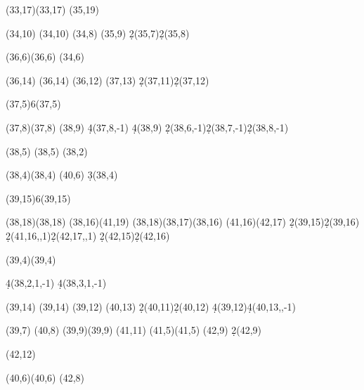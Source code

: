 \documentclass{article}
\begin{document}
\begin{sseqdata}
\class["P^4h_1"](33,17)\etasqclass(33,17)
\divfourclass["P^4h_2" right](35,19)

\class(34,10)
\divfourclass["d_0g" left](34,10)
\etaclass(34,8)
\divfourclass["m" right](35,9)
\d2(35,7)\d2(35,8) %


\class["t"](36,6)\etaclass(36,6)
\nustruct(34,6)

\class(36,14)
\divfourclass["P^2g" left](36,14)
\etaclass(36,12)
\divfourclass["Pk" {right=0em}](37,13)
\d2(37,11)\d2(37,12) %


\tower(37,5){6}\classoptions["x"](37,5)

\class["e_0g"](37,8)\etaclass(37,8)
\diveightclass["y" right](38,9)
\d4(37,8,-1) \d4(38,9)%
\d2(38,6,-1)\d2(38,7,-1)\d2(38,8,-1) %

\class(38,5)
\diveightclass["h_3h_5" below](38,5)
\etasqclass(38,2)

\class["e_1" {below=0em,xshift=2pt}](38,4)\etasqclass(38,4)
\divfourclass["f_1" right](40,6)
\d3(38,4) %

\tower(39,15){6}\classoptions["P^2i" {right=0em}](39,15)

\class(38,18)\divfourclass["P^3d_0" {below left=0em}](38,18)
\etacubclass(38,16)\diveightclass["P^3e_0" {below=0em}](41,19)
\nustruct(38,18)\nustruct(38,17)\nustruct(38,16)
\etaclass(41,16)\divfourclass["P^2j" {below=0em}](42,17)
\d2(39,15)\d2(39,16) %
\d2(41,16,,1)\d2(42,17,,1) %
\d2(42,15)\d2(42,16) %



\class["c_0 h_5" {below=-0.3em}](39,4)\etaclass(39,4)

\d4(38,2,1,-1) \d4(38,3,1,-1) %


\class(39,14)
\divfourclass["Pd_0e_0" {below=-0.2em}](39,14)
\etaclass(39,12)
\divfourclass["Pl" {below=0em}](40,13)
\d2(40,11)\d2(40,12) %
\d4(39,12)\d4(40,13,,-1) %



\class["c_1g"](39,7)
\class["g^2"](40,8)
\class["u"](39,9)\etasqclass(39,9)
\divtwoclass["z"](41,11)
\class(41,5)\divfourclass["c_2"](41,5)
\class["v"](42,9)
\d2(42,9) %

\class["d_0^3"](42,12)

\class["Ph_1h_5" {right=0em}](40,6)\etasqclass(40,6)
\divfourclass["Ph_2h_5" {right=0em}](42,8)



\end{sseqdata}
\end{document}
